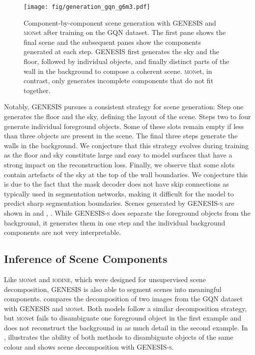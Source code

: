 \documentclass{article}
\begin{document}
\clearpage

\begin{figure}[h!]
    \centering
    \texttt{[image: fig/generation\_gqn\_g6m3.pdf]}
    \caption{Component-by-component scene generation with \gls{GENESIS} and \textsc{mon}et after training on the GQN dataset. The first pane shows the final scene and the subsequent panes show the components generated at each step. \gls{GENESIS} first generates the sky and the floor, followed by individual objects, and finally distinct parts of the wall in the background to compose a coherent scene. \textsc{mon}et, in contrast, only generates incomplete components that do not fit together.}
    \label{fig:generation_gqn}
\end{figure}


Notably, \gls{GENESIS} pursues a consistent strategy for scene generation:
Step one generates the floor and the sky, defining the layout of the scene.
Steps two to four generate individual foreground objects.
Some of these slots remain empty if less than three objects are present in the scene.
The final three steps  generate the walls in the background.
We conjecture that this strategy evolves during training as the floor and sky constitute large and easy to model surfaces that have a strong impact on the reconstruction loss.
Finally, we observe that some slots contain artefacts of the sky at the top of the wall boundaries.
We conjecture this is due to the fact that the mask decoder does not have skip connections as typically used in segmentation networks, making it difficult for the model to predict sharp segmentation boundaries.
Scenes generated by \gls{GENESIS}\textsc{-s} are shown in  and , . While \gls{GENESIS}\textsc{-s} does separate the foreground objects from the background, it generates them in one step and the individual background components are not very interpretable.




\clearpage

\subsection{Inference of Scene Components}

Like \textsc{mon}et and \textsc{iodine}, which were designed for unsupervised scene decomposition, \gls{GENESIS} is also able to segment scenes into meaningful components.
 compares the decomposition of two images from the GQN dataset with \gls{GENESIS} and \textsc{mon}et.
Both models follow a similar decomposition strategy, but \textsc{mon}et fails to disambiguate one foreground object in the first example and does not reconstruct the background in as much detail in the second example.
In ,  illustrates the ability of both methods to disambiguate objects of the same colour and  shows scene decomposition with \gls{GENESIS}\textsc{-s}.
\end{document}
